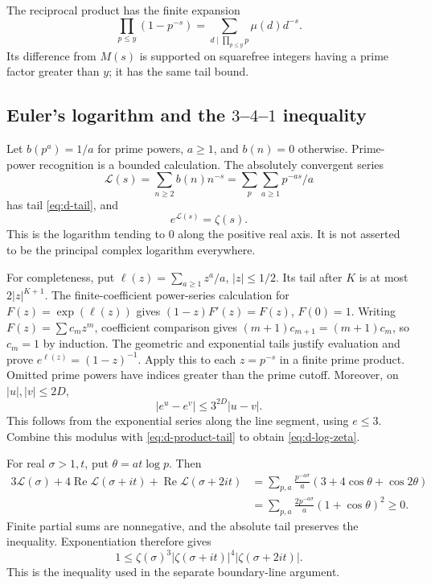 The reciprocal product has the finite expansion
\[
 \prod_{p\leq y}(1-p^{-s})
       =\sum_{d\mid\prod_{p\leq y}p}\mu(d)d^{-s}.
\]
Its difference from \(M(s)\) is supported on squarefree integers having
a prime factor greater than \(y\); it has the same tail bound.

\subsection{Euler's logarithm and the \(3\)--\(4\)--\(1\) inequality}

Let \(b(p^a)=1/a\) for prime powers, \(a\geq1\), and \(b(n)=0\) otherwise.
Prime-power recognition is a bounded calculation. The absolutely
convergent series
\[
 \mathcal L(s)=\sum_{n\geq2}b(n)n^{-s}
             =\sum_p\sum_{a\geq1}p^{-as}/a             \tag{D10}\label{eq:d-log-series}
\]
has tail \eqref{eq:d-tail}, and
\[
                         e^{\mathcal L(s)}=\zeta(s).  \tag{D11}\label{eq:d-log-zeta}
\]
This is the logarithm tending to \(0\) along the positive real axis.
It is not asserted to be the principal complex logarithm everywhere.

For completeness, put \(\ell(z)=\sum_{a\geq1}z^a/a\), \(|z|\leq1/2\).
Its tail after \(K\) is at most \(2|z|^{K+1}\).
The finite-coefficient power-series calculation for
\(F(z)=\exp(\ell(z))\) gives \((1-z)F'(z)=F(z)\), \(F(0)=1\).
Writing \(F(z)=\sum c_mz^m\), coefficient comparison gives
\((m+1)c_{m+1}=(m+1)c_m\), so \(c_m=1\) by induction.
The geometric and exponential tails justify evaluation and prove
\(e^{\ell(z)}=(1-z)^{-1}\).
Apply this to each \(z=p^{-s}\) in a finite prime product.
Omitted prime powers have indices greater than the prime cutoff.
Moreover, on \(|u|,|v|\leq2D\),
\[
                    |e^u-e^v|\leq3^{2D}|u-v|.
\]
This follows from the exponential series along the line segment, using
\(e\leq3\). Combine this modulus with \eqref{eq:d-product-tail} to
obtain \eqref{eq:d-log-zeta}.

For real \(\sigma>1,t\), put \(\theta=at\log p\). Then
\[
\begin{split}
3\mathcal L(\sigma)+4\operatorname{Re}\mathcal L(\sigma+it)
             +\operatorname{Re}\mathcal L(\sigma+2it)
 &=\sum_{p,a}\frac{p^{-a\sigma}}a
                  (3+4\cos\theta+\cos2\theta)\\
 &=\sum_{p,a}\frac{2p^{-a\sigma}}a(1+\cos\theta)^2\geq0 .
\end{split}
\]
Finite partial sums are nonnegative, and the absolute tail preserves the
inequality. Exponentiation therefore gives
\[
 \boxed{1\leq\zeta(\sigma)^3|\zeta(\sigma+it)|^4
                                  |\zeta(\sigma+2it)|.}
                                                               \tag{D12}\label{eq:d-341}
\]
This is the inequality used in the separate boundary-line argument.

